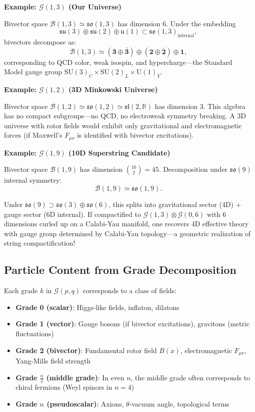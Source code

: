 \documentclass[11pt,a4paper]{article}
\numberwithin{equation}{section}
\theoremstyle{plain}
\theoremstyle{definition}
\theoremstyle{remark}
\newcommand{\R}{\mathbb{R}}
\newcommand{\Cl}{\mathcal{G}}               %
\newcommand{\Biv}{\mathcal{B}}             %
\begin{document}
\textbf{Example: $\Cl(1,3)$ (Our Universe)}

Bivector space $\Biv(1,3) \simeq \mathfrak{so}(1,3)$ has dimension 6. Under the embedding
\begin{equation}
\mathfrak{su}(3) \oplus \mathfrak{su}(2) \oplus \mathfrak{u}(1) \subset \mathfrak{so}(1,3)_{\text{internal}},
\end{equation}
bivectors decompose as:
\begin{equation}
\Biv(1,3) \simeq (\mathbf{3} \oplus \bar{\mathbf{3}}) \oplus (\mathbf{2} \oplus \bar{\mathbf{2}}) \oplus \mathbf{1},
\end{equation}
corresponding to QCD color, weak isospin, and hypercharge—the Standard Model gauge group $\mathrm{SU}(3)_C \times \mathrm{SU}(2)_L \times \mathrm{U}(1)_Y$.

\textbf{Example: $\Cl(1,2)$ (3D Minkowski Universe)}

Bivector space $\Biv(1,2) \simeq \mathfrak{so}(1,2) \simeq \mathfrak{sl}(2,\R)$ has dimension 3. This algebra has no compact subgroups—no QCD, no electroweak symmetry breaking. A 3D universe with rotor fields would exhibit only gravitational and electromagnetic forces (if Maxwell's $F_{\mu\nu}$ is identified with bivector excitations).

\textbf{Example: $\Cl(1,9)$ (10D Superstring Candidate)}

Bivector space $\Biv(1,9)$ has dimension $\binom{10}{2} = 45$. Decomposition under $\mathfrak{so}(9)$ internal symmetry:
\begin{equation}
\Biv(1,9) \simeq \mathfrak{so}(1,9).
\end{equation}

Under $\mathfrak{so}(9) \supset \mathfrak{so}(3) \oplus \mathfrak{so}(6)$, this splits into gravitational sector (4D) + gauge sector (6D internal). If compactified to $\Cl(1,3) \otimes \Cl(0,6)$ with 6 dimensions curled up on a Calabi-Yau manifold, one recovers 4D effective theory with gauge group determined by Calabi-Yau topology—a geometric realization of string compactification!

\subsection{Particle Content from Grade Decomposition}

Each grade $k$ in $\Cl(p,q)$ corresponds to a class of fields:

\begin{itemize}
\item \textbf{Grade 0 (scalar)}: Higgs-like fields, inflaton, dilatons
\item \textbf{Grade 1 (vector)}: Gauge bosons (if bivector excitations), gravitons (metric fluctuations)
\item \textbf{Grade 2 (bivector)}: Fundamental rotor field $B(x)$, electromagnetic $F_{\mu\nu}$, Yang-Mills field strength
\item \textbf{Grade $\frac{n}{2}$ (middle grade)}: In even $n$, the middle grade often corresponds to chiral fermions (Weyl spinors in $n=4$)
\item \textbf{Grade $n$ (pseudoscalar)}: Axions, $\theta$-vacuum angle, topological terms
\end{itemize}
\end{document}
